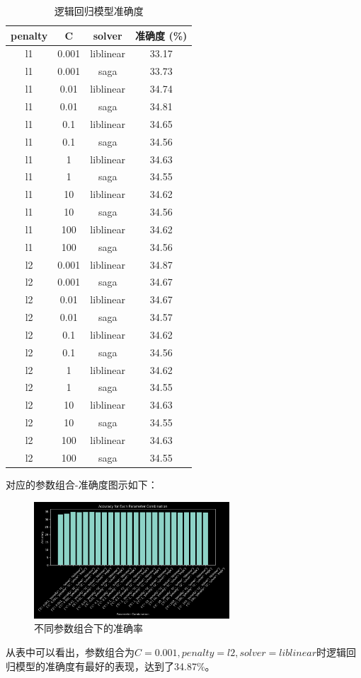 \documentclass[12pt,a4paper]{article}
\begin{document}
\begin{table}[H]
    \centering
    \caption{逻辑回归模型准确度}
    \label{tab:lr_performance}
    \begin{tabular}{cccc}
    \toprule
    penalty & C & solver & 准确度 (\%) \\
    \midrule
    l1 & 0.001 & liblinear & 33.17 \\
    l1 & 0.001 & saga & 33.73 \\
    l1 & 0.01 & liblinear & 34.74 \\
    l1 & 0.01 & saga & 34.81 \\
    l1 & 0.1 & liblinear & 34.65 \\
    l1 & 0.1 & saga & 34.56 \\
    l1 & 1 & liblinear & 34.63 \\
    l1 & 1 & saga & 34.55 \\
    l1 & 10 & liblinear & 34.62 \\
    l1 & 10 & saga & 34.56 \\
    l1 & 100 & liblinear & 34.62 \\
    l1 & 100 & saga & 34.56 \\
    l2 & 0.001 & liblinear & 34.87 \\
    l2 & 0.001 & saga & 34.67 \\
    l2 & 0.01 & liblinear & 34.67 \\
    l2 & 0.01 & saga & 34.57 \\
    l2 & 0.1 & liblinear & 34.62 \\
    l2 & 0.1 & saga & 34.56 \\
    l2 & 1 & liblinear & 34.62 \\
    l2 & 1 & saga & 34.55 \\
    l2 & 10 & liblinear & 34.63 \\
    l2 & 10 & saga & 34.55 \\
    l2 & 100 & liblinear & 34.63 \\
    l2 & 100 & saga & 34.55 \\
    \bottomrule
    \end{tabular}
    \end{table}
对应的参数组合-准确度图示如下：
\begin{figure}[H]
    \centering
    \includegraphics[width=0.65\textwidth]{plot2.png}
    \caption{不同参数组合下的准确率}
\end{figure}
从表中可以看出，参数组合为$C=0.001, penalty = l2, solver = liblinear$时逻辑回归模型的准确度有最好的表现，达到了34.87\%。
\end{document}
